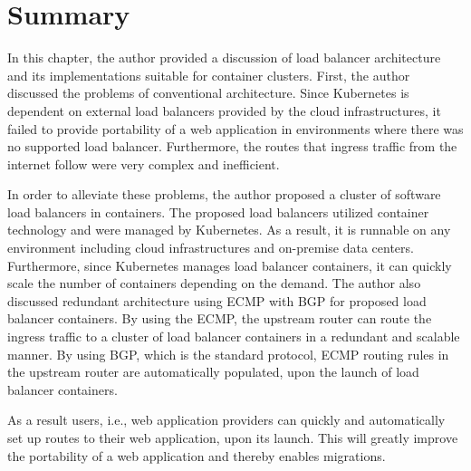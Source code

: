 \FloatBarrier



\section{Summary}

In this chapter, the author provided a discussion of load balancer architecture and its implementations suitable for container clusters.
%
First, the author discussed the problems of conventional architecture.
Since Kubernetes is dependent on external load balancers provided by the cloud infrastructures,
it failed to provide portability of a web application in environments where there was no supported load balancer.
Furthermore, the routes that ingress traffic from the internet follow were very complex and inefficient.

In order to alleviate these problems, the author proposed a cluster of software load balancers in containers.
The proposed load balancers utilized container technology and were managed by Kubernetes.
As a result, it is runnable on any environment including cloud infrastructures and on-premise data centers.
Furthermore, since Kubernetes manages load balancer containers, it can quickly scale the number of containers depending on the demand.
%
The author also discussed redundant architecture using ECMP with BGP for proposed load balancer containers.
By using the ECMP, the upstream router can route the ingress traffic to a cluster of load balancer containers in a redundant and scalable manner.
By using BGP, which is the standard protocol, ECMP routing rules in the upstream router are automatically populated, upon the launch of load balancer containers.

As a result users, i.e., web application providers can quickly and automatically set up routes to their web application, upon its launch.
This will greatly improve the portability of a web application and thereby enables migrations.


